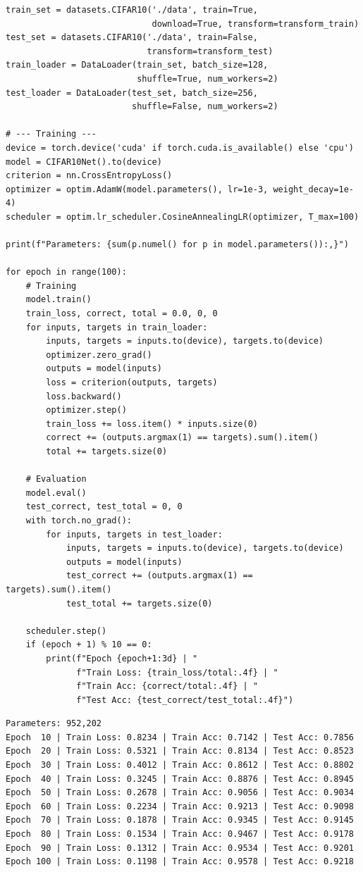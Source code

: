 \begin{codeblock}[title=\textbf{CNN for CIFAR-10 with full training}]
\begin{verbatim}
train_set = datasets.CIFAR10('./data', train=True,
                             download=True, transform=transform_train)
test_set = datasets.CIFAR10('./data', train=False,
                            transform=transform_test)
train_loader = DataLoader(train_set, batch_size=128,
                          shuffle=True, num_workers=2)
test_loader = DataLoader(test_set, batch_size=256,
                         shuffle=False, num_workers=2)

# --- Training ---
device = torch.device('cuda' if torch.cuda.is_available() else 'cpu')
model = CIFAR10Net().to(device)
criterion = nn.CrossEntropyLoss()
optimizer = optim.AdamW(model.parameters(), lr=1e-3, weight_decay=1e-4)
scheduler = optim.lr_scheduler.CosineAnnealingLR(optimizer, T_max=100)

print(f"Parameters: {sum(p.numel() for p in model.parameters()):,}")

for epoch in range(100):
    # Training
    model.train()
    train_loss, correct, total = 0.0, 0, 0
    for inputs, targets in train_loader:
        inputs, targets = inputs.to(device), targets.to(device)
        optimizer.zero_grad()
        outputs = model(inputs)
        loss = criterion(outputs, targets)
        loss.backward()
        optimizer.step()
        train_loss += loss.item() * inputs.size(0)
        correct += (outputs.argmax(1) == targets).sum().item()
        total += targets.size(0)

    # Evaluation
    model.eval()
    test_correct, test_total = 0, 0
    with torch.no_grad():
        for inputs, targets in test_loader:
            inputs, targets = inputs.to(device), targets.to(device)
            outputs = model(inputs)
            test_correct += (outputs.argmax(1) == targets).sum().item()
            test_total += targets.size(0)

    scheduler.step()
    if (epoch + 1) % 10 == 0:
        print(f"Epoch {epoch+1:3d} | "
              f"Train Loss: {train_loss/total:.4f} | "
              f"Train Acc: {correct/total:.4f} | "
              f"Test Acc: {test_correct/test_total:.4f}")
\end{verbatim}
\end{codeblock}

\begin{codeoutput}
\begin{verbatim}
Parameters: 952,202
Epoch  10 | Train Loss: 0.8234 | Train Acc: 0.7142 | Test Acc: 0.7856
Epoch  20 | Train Loss: 0.5321 | Train Acc: 0.8134 | Test Acc: 0.8523
Epoch  30 | Train Loss: 0.4012 | Train Acc: 0.8612 | Test Acc: 0.8802
Epoch  40 | Train Loss: 0.3245 | Train Acc: 0.8876 | Test Acc: 0.8945
Epoch  50 | Train Loss: 0.2678 | Train Acc: 0.9056 | Test Acc: 0.9034
Epoch  60 | Train Loss: 0.2234 | Train Acc: 0.9213 | Test Acc: 0.9098
Epoch  70 | Train Loss: 0.1878 | Train Acc: 0.9345 | Test Acc: 0.9145
Epoch  80 | Train Loss: 0.1534 | Train Acc: 0.9467 | Test Acc: 0.9178
Epoch  90 | Train Loss: 0.1312 | Train Acc: 0.9534 | Test Acc: 0.9201
Epoch 100 | Train Loss: 0.1198 | Train Acc: 0.9578 | Test Acc: 0.9218
\end{verbatim}
\end{codeoutput}

